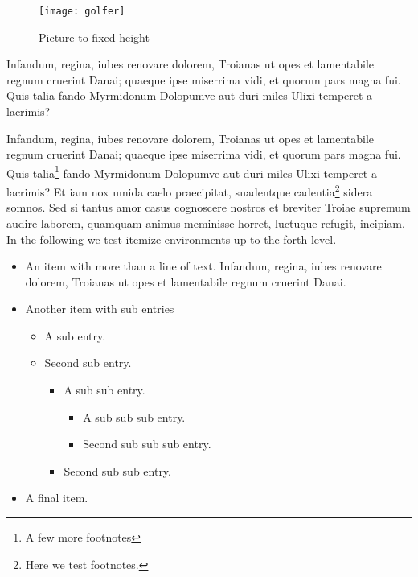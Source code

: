 \documentclass[
    ,final            %
  ]
  {aipproc}
\begin{document}
\begin{figure}
  \texttt{[image: golfer]}
  \caption{Picture to fixed height}
\end{figure}

Infandum, regina, iubes renovare dolorem, Troianas ut opes et
lamentabile regnum cruerint Danai; quaeque ipse miserrima vidi, et
quorum pars magna fui. Quis talia fando Myrmidonum Dolopumve aut duri
miles Ulixi temperet a lacrimis?

Infandum, regina, iubes renovare dolorem, Troianas ut opes et
lamentabile regnum cruerint Danai; quaeque ipse miserrima vidi, et
quorum pars magna fui. Quis talia\footnote{A few more footnotes} fando
Myrmidonum Dolopumve aut duri miles Ulixi temperet a lacrimis? Et iam
nox umida caelo praecipitat, suadentque cadentia\footnote{Here we test
footnotes.} sidera somnos. Sed si tantus amor casus cognoscere nostros
et breviter Troiae supremum audire laborem, quamquam animus meminisse
horret, luctuque refugit, incipiam.
In the following we test itemize environments up to the forth level.
\begin{itemize}
\item
  An item with more than a line of text. Infandum, regina, iubes
  renovare dolorem, Troianas ut opes et lamentabile regnum cruerint
  Danai.
\item
  Another item with sub entries
  \begin{itemize}
  \item
   A sub entry.
  \item
   Second sub entry.
    \begin{itemize}
    \item
     A sub sub entry.
      \begin{itemize}
      \item
       A sub sub sub entry.
      \item
       Second sub sub sub entry.
      \end{itemize}
    \item
     Second sub sub entry.
    \end{itemize}
  \end{itemize}
\item
  A final item.
\end{itemize}

\end{document}
